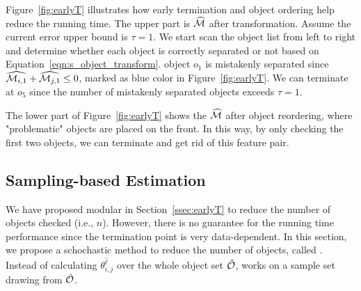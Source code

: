 \begin{example}
Figure~\ref{fig:earlyT} illustrates how early termination and object ordering help reduce the running time. The upper part is $\widehat{\mm}$ after transformation. Assume the current error upper bound is $\tau=1$. We start scan the object list from left to right and determine whether each object is correctly separated or not based on Equation~\ref{eqn:s_object_transform}. object $o_1$ is mistakenly separated since $\widehat{\mm_{i,1}}+\widehat{\mm_{j,1}}\leq0$, marked as blue color in Figure~\ref{fig:earlyT}. We can terminate at $o_5$ since the number of mistakenly separated objects exceeds $\tau=1$.

The lower part of Figure~\ref{fig:earlyT} shows the $\widehat{\mm}$ after object reordering, where "problematic" objects are placed on the front. In this way, by only checking the first two objects, we can terminate and get rid of this feature pair.
\end{example}

\subsection{Sampling-based Estimation} \label{ssec:sampling}
We have proposed \earlyT modular in Section~\ref{ssec:earlyT} to reduce the number of objects checked (i.e., $n$). However, there is no guarantee for the running time performance since the termination point is very data-dependent. In this section, we propose a schochastic method to reduce the number of objects, called \sampling. Instead of calculating $\theta_{i,j}^{\hat{\ell}}$ over the whole object set $\hat{\oo}$, \sampling works on a sample set drawing from $\hat{\oo}$.

